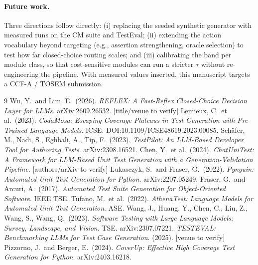 \documentclass[11pt]{article}
\begin{document}
\paragraph{Future work.} Three directions follow directly: (i) replacing the seeded synthetic generator with measured runs on the CM suite and TestEval; (ii) extending the action vocabulary beyond targeting (e.g., assertion strengthening, oracle selection) to test how far closed-choice routing scales; and (iii) calibrating the band per module class, so that cost-sensitive modules can run a stricter $\tau$ without re-engineering the pipeline. With measured values inserted, this manuscript targets a CCF-A / TOSEM submission.

\begin{thebibliography}{9}
 Wu, Y.\ and Lim, E.\ (2026). \emph{REFLEX: A Fast-Reflex Closed-Choice Decision Layer for LLMs}. arXiv:2609.26532. \textcolor{warn}{[title/venue to verify]}
 Lemieux, C.\ et al.\ (2023). \emph{CodaMosa: Escaping Coverage Plateaus in Test Generation with Pre-Trained Language Models}. ICSE. DOI:10.1109/ICSE48619.2023.00085.
 Sch\"afer, M., Nadi, S., Eghbali, A., Tip, F.\ (2023). \emph{TestPilot: An LLM-Based Developer Tool for Authoring Tests}. arXiv:2308.16521.
 Chen, Y.\ et al.\ (2024). \emph{ChatUniTest: A Framework for LLM-Based Unit Test Generation with a Generation-Validation Pipeline}. \textcolor{warn}{[authors/arXiv to verify]}
 Lukasczyk, S.\ and Fraser, G.\ (2022). \emph{Pynguin: Automated Unit Test Generation for Python}. arXiv:2207.05249.
 Fraser, G.\ and Arcuri, A.\ (2017). \emph{Automated Test Suite Generation for Object-Oriented Software}. IEEE TSE.
 Tufano, M.\ et al.\ (2022). \emph{AthenaTest: Language Models for Automated Unit Test Generation}. ASE.
 Wang, J., Huang, Y., Chen, C., Liu, Z., Wang, S., Wang, Q.\ (2023). \emph{Software Testing with Large Language Models: Survey, Landscape, and Vision}. TSE. arXiv:2307.07221.
 \emph{TESTEVAL: Benchmarking LLMs for Test Case Generation}. (2025). \textcolor{warn}{[venue to verify]}
 Pizzorno, J.\ and Berger, E.\ (2024). \emph{CoverUp: Effective High Coverage Test Generation for Python}. arXiv:2403.16218.
\end{thebibliography}
\end{document}
